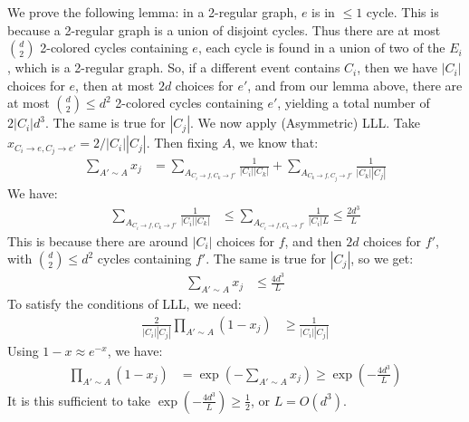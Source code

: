 \documentclass[12pt]{article}
\begin{document}
    We prove the following lemma: in a 2-regular graph, $e$ is in $\leq 1$ cycle. This is because a 2-regular graph is a union of disjoint cycles. Thus there are at most ${d \choose 2}$ 2-colored cycles containing $e$, each cycle is found in a union of two of the $E_i$, which is a 2-regular graph. So, if a different event contains $C_i$, then we have $|C_i|$ choices for $e$, then at most $2d$ choices for $e'$, and from our lemma above, there are at most ${d \choose 2} \leq d^2$ 2-colored cycles containing $e'$, yielding a total number of $2|C_i| d^3$. The same is true for $|C_j|$. We now apply (Asymmetric) LLL. Take $x_{C_i \to e, C_j \to e'} = 2/|C_i||C_j|$. Then fixing $A$, we know that:
    \begin{align*}
        \sum_{A' \sim A} x_j &= \sum_{A_{C_i \to f, C_k \to f'}} \frac{1}{|C_i||C_k|} + \sum_{A_{C_k \to f, C_j \to f'}} \frac{1}{|C_k||C_j|} 
    \end{align*}
    We have:
    \begin{align*}
        \sum_{A_{C_i \to f, C_k \to f'}} \frac{1}{|C_i||C_k|} &\leq \sum_{A_{C_i \to f, C_k \to f'}}  \frac{1}{|C_i| L} \leq \frac{2d^3}{L}
    \end{align*}
    This is because there are around $|C_i|$ choices for $f$, and then $2d$ choices for $f'$, with ${d \choose 2} \leq d^2$ cycles containing $f'$. The same is true for $|C_j|$, so we get:
    \begin{align*}
        \sum_{A' \sim A} x_j &\leq \frac{4d^3}{L}
    \end{align*}
    To satisfy the conditions of LLL, we need:
    \begin{align*}
        \frac{2}{|C_i||C_j|} \prod_{A' \sim A} (1-x_j) &\geq \frac{1}{|C_i||C_j|}
    \end{align*}
    Using $1-x \approx e^{-x}$, we have:
    \begin{align*}
        \prod_{A' \sim A} (1-x_j) &= \exp(-\sum_{A' \sim A} x_j) \geq \exp(-\frac{4d^3}{L})
    \end{align*}
    It is this sufficient to take $\exp(-\frac{4d^3}{L}) \geq \frac{1}{2}$, or $L = O(d^3)$. 
\end{document}
